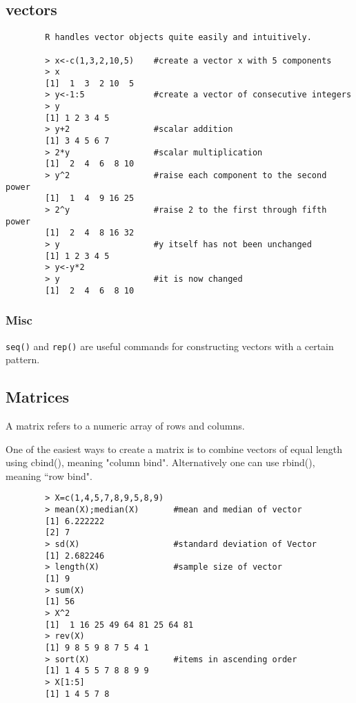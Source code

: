 \documentclass[a4paper,12pt]{article}
\begin{document}
	\subsection{vectors}
	\large
	\begin{framed}
		\begin{verbatim}
		R handles vector objects quite easily and intuitively.
		
		> x<-c(1,3,2,10,5)    #create a vector x with 5 components
		> x
		[1]  1  3  2 10  5
		> y<-1:5              #create a vector of consecutive integers
		> y
		[1] 1 2 3 4 5
		> y+2                 #scalar addition
		[1] 3 4 5 6 7
		> 2*y                 #scalar multiplication
		[1]  2  4  6  8 10
		> y^2                 #raise each component to the second power
		[1]  1  4  9 16 25
		> 2^y                 #raise 2 to the first through fifth power
		[1]  2  4  8 16 32
		> y                   #y itself has not been unchanged
		[1] 1 2 3 4 5
		> y<-y*2
		> y                   #it is now changed
		[1]  2  4  6  8 10
		\end{verbatim}
	\end{framed}
	\large
	
	\subsubsection{Misc}
	\texttt{seq()} and \texttt{rep()} are useful commands for constructing vectors with a certain pattern.
	
	
	\subsection{Matrices}
	A matrix refers to a numeric array of rows and columns.
	
	One of the easiest ways to create a matrix is to combine vectors of equal
	length using cbind(), meaning "column bind". Alternatively one can use rbind(), meaning ``row bind".

	
	\large
	\begin{framed}
		\begin{verbatim}
		> X=c(1,4,5,7,8,9,5,8,9)
		> mean(X);median(X)       #mean and median of vector
		[1] 6.222222
		[2] 7
		> sd(X)                   #standard deviation of Vector
		[1] 2.682246
		> length(X)               #sample size of vector
		[1] 9
		> sum(X)
		[1] 56
		> X^2
		[1]  1 16 25 49 64 81 25 64 81
		> rev(X)
		[1] 9 8 5 9 8 7 5 4 1
		> sort(X)                 #items in ascending order
		[1] 1 4 5 5 7 8 8 9 9
		> X[1:5]
		[1] 1 4 5 7 8
		\end{verbatim}
	\end{framed}
	\large
	
\end{document}

